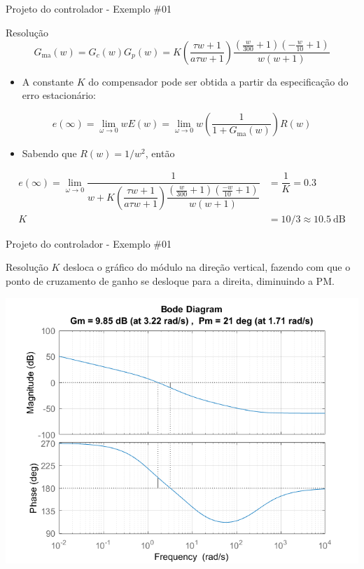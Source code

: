 \begin{frame}{Projeto do controlador - Exemplo \#01}
    \begin{block}{Resolução}
    \begin{equation*}
        G_{\text{ma}}(w) = G_c(w)G_p(w) = K{\left(\dfrac{\tau w + 1}{a\tau w + 1}\right)}\dfrac{\left(\frac{w}{300} + 1\right) \left(-\frac{w}{10} + 1\right)}{w(w + 1)}
    \end{equation*}
    \begin{itemize}
        \item A constante $K$ do compensador pode ser obtida a partir da especificação do erro estacionário:
    \end{itemize}
    \begin{equation*}
        e(\infty) = \lim_{\omega \to 0} w E(w) = \lim_{\omega \to 0} w \left ( \dfrac{1}{1 + G_\text{ma}(w)} \right) R(w)
    \end{equation*}
    \vspace{-0.2cm}
    \begin{itemize}
        \item Sabendo que $ R(w) = 1/w^2 $,
        então
    \end{itemize}
    \begin{align*}
        e(\infty) = \lim_{\omega \to 0} \dfrac{1}{w + K{\left(\dfrac{\tau w + 1}{a\tau w + 1}\right)}\dfrac{\left(\frac{w}{300} + 1\right) \left(\frac{-w}{10} + 1\right)}{w(w + 1)}} &= \dfrac{1}{K} = \num{0,3}  \\
        K &= 10/3 \approx \num{10,5} \ \text{dB}
    \end{align*}
\end{block}
\end{frame}

\begin{frame}{Projeto do controlador - Exemplo \#01}
    \begin{block}{Resolução}
    $K$ desloca o gráfico do módulo na direção vertical, fazendo com que o ponto de cruzamento de ganho se desloque para a direita, diminuindo a PM.
\end{block}
\centerline{\includegraphics[width=0.65\linewidth]{Figuras/Ch13/fig11.png}}
\end{frame}

